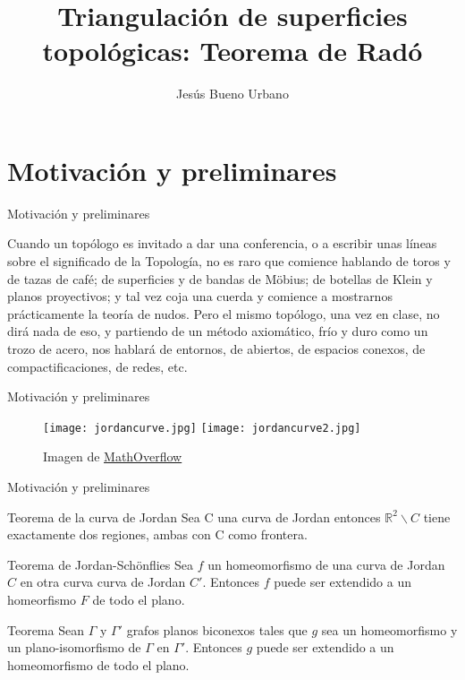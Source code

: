 \documentclass{beamer}
\title[Teorema de Radó]{Triangulación de superficies\\topológicas: Teorema de Radó}
\subtitle{}
\author[Jesús Bueno]{Jesús Bueno Urbano}
\institute[Universidad de Granada]{Grado en Matemáticas\\Universidad de Granada}
\date{}
\begin{document}
\begin{frame}
  \titlepage
\end{frame}

\section*{Motivación y preliminares}

\begin{frame}{Motivación y preliminares}
	\begin{block}{}
		Cuando un topólogo es invitado a dar una conferencia, o a escribir unas líneas sobre el significado de la Topología, no es raro que comience hablando de toros y de tazas de café; de superficies y de bandas de Möbius; de botellas de Klein y planos proyectivos; y tal vez coja una cuerda y comience a mostrarnos prácticamente la teoría de nudos. Pero el mismo topólogo, una vez en clase, no dirá nada de eso, y partiendo de un método axiomático, frío y duro como un trozo de acero, nos hablará de entornos, de abiertos, de espacios conexos, de compactificaciones, de redes, etc.
	\end{block}
\end{frame}

\begin{frame}{Motivación y preliminares}
\begin{figure}[h]
\centering
\begin{minipage}[c]{\textwidth}
\centering
    \texttt{[image: jordancurve.jpg]}
    \texttt{[image: jordancurve2.jpg]}
    \caption{Imagen de \href{https://mathoverflow.net/questions/8521/nice-proof-of-the-jordan-curve-theorem}{MathOverflow}}
\end{minipage}
\end{figure}
\end{frame}

\begin{frame}{Motivación y preliminares}
	\begin{block}{Teorema de la curva de Jordan}
	Sea C una curva de Jordan entonces $\mathbb{R}^2 \backslash C$ tiene exactamente dos regiones, ambas con C como frontera.
	\end{block}
	\pause
    \begin{block}{Teorema de Jordan-Schönflies}
	Sea $f$ un homeomorfismo de una curva de Jordan $C$ en otra curva curva de Jordan $C'$. Entonces $f$ puede ser extendido a un homeorfismo $F$ de todo el plano.
	\end{block}
	\pause
	\begin{block}{Teorema}
	Sean $\Gamma$ y $\Gamma'$ grafos planos biconexos tales que $g$ sea un homeomorfismo y un plano-isomorfismo de $\Gamma$ en $\Gamma'$. Entonces $g$ puede ser extendido a un homeomorfismo de todo el plano.
	\end{block}
\end{frame}
\end{document}
